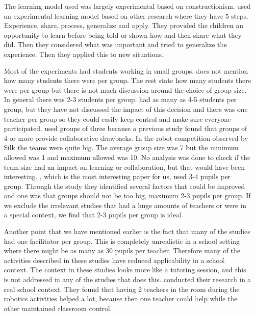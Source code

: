 \bigskip\noindent
The learning model used was largely experimental based on constructionism.  used an experimental learning model based on other research where they have 5 steps. Experience, share, process, generalize and apply. They provided the children an opportunity to learn before being told or shown how and then share what they did. Then they considered what was important and tried to generalize the experience. Then they applied this to new situations.

\bigskip\noindent
Most of the experiments had students working in small groups.  does not mention how many students there were per group. The rest state how many students there were per group but there is not much discussion around the choice of group size. In general there was 2-3 students per group\cite{mitnik2009collaborative, norton2004using, lindh2007does, silk2011resources, nugent2009use, williams2007acquisition}. \cite{barker2007robotics} had as many as 4-5 students per group, but they have not discussed the impact of this decision and there was one teacher per group so they could easily keep control and make sure everyone participated.  used groups of three because a previous study found that groups of 4 or more provide collaborative drawbacks. In the robot competition observed by Silk \cite{silk2011resources} the teams were quite big. The average group size was 7 but the minimum allowed was 1 and maximum allowed was 10. No analysis was done to check if the team size had an impact on learning or collaboration, but that would have been interesting. , which is the most interesting paper for us, used 3-4 pupils per group. Through the study they identified several factors that could be improved and one was that groups should not be too big, maximum 2-3 pupils per group. If we exclude the irrelevant studies that had a huge amounts of teachers or were in a special context, we find that 2-3 pupils per group is ideal.

\bigskip\noindent
Another point that we have mentioned earlier is the fact that many of the studies had one facilitator per group. This is completely unrealistic in a school setting where there might be as many as 30 pupils per teacher. Therefore many of the activities described in these studies have reduced applicability in a school context. The context in these studies looks more like a tutoring session, and this is not addressed in any of the studies that does this.  conducted their research in a real school context. They found that having 2 teachers in the room during the robotics activities helped a lot, because then one teacher could help while the other maintained classroom control.

